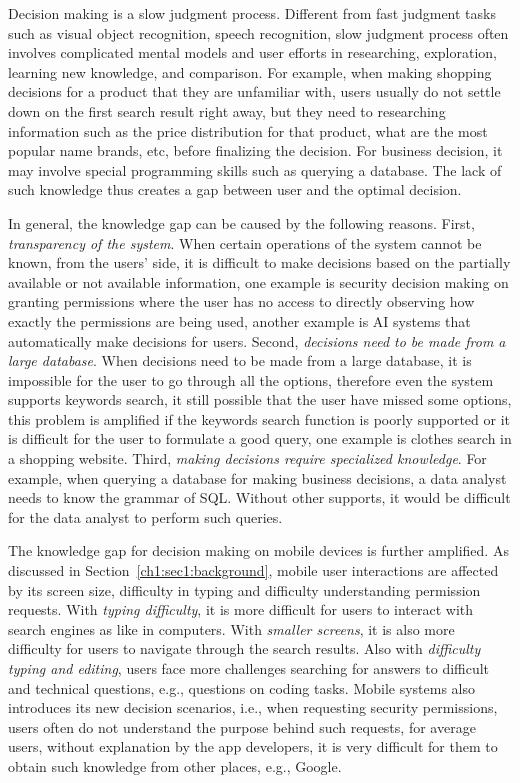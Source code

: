Decision making is a slow judgment process. Different from fast judgment tasks such as visual object recognition, speech recognition, slow judgment process often involves complicated mental models and user efforts in researching, exploration, learning new knowledge, and comparison. For example, when making shopping decisions for a product that they are unfamiliar with, users usually do not settle down on the first search result right away, but they need to researching information such as the price distribution for that product, what are the most popular name brands, etc, before finalizing the decision. For business decision, it may involve special programming skills such as querying a database. The lack of such knowledge thus creates a gap between user and the optimal decision. 

In general, the knowledge gap can be caused by the following reasons. First, \emph{transparency of the system}. When certain operations of the system cannot be known, from the users' side, it is difficult to make decisions based on the partially available or not available information, one example is security decision making on granting permissions where the user has no access to directly observing how exactly the permissions are being used, another example is AI systems that automatically make decisions for users. Second, \emph{decisions need to be made from a large database}. When decisions need to be made from a large database, it is impossible for the user to go through all the options, therefore even the system supports keywords search, it still possible that the user have missed some options, this problem is amplified if the keywords search function is poorly supported or it is difficult for the user to formulate a good query, one example is clothes search in a shopping website. Third, \emph{making decisions require specialized knowledge}. For example, when querying a database for making business decisions, a data analyst needs to know the grammar of SQL. Without other supports, it would be difficult for the data analyst to perform such queries. 

The knowledge gap for decision making on mobile devices is further amplified. As discussed in Section~\ref{ch1:sec1:background}, mobile user interactions are affected by its screen size, difficulty in typing and difficulty understanding permission requests. With \emph{typing difficulty}, it is more difficult for users to interact with search engines as like in computers. With \emph{smaller screens}, it is also more difficulty for users to navigate through the search results. Also with \emph{difficulty typing and editing}, users face more challenges searching for answers to difficult and technical questions, e.g., questions on coding tasks. Mobile systems also introduces its new decision scenarios, i.e., when requesting security permissions, users often do not understand the purpose behind such requests, for average users, without explanation by the app developers, it is very difficult for them to obtain such knowledge from other places, e.g., Google.

